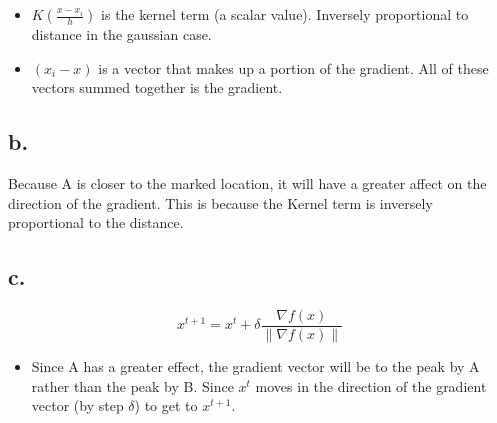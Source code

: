 \documentclass[11pt]{article}
\begin{document}
\begin{itemize}
\item \(K(\frac{x-x_i}{h})\) is the kernel term (a scalar value). Inversely
proportional to distance in the gaussian case.
\item \((x_i-x)\) is a vector that makes up a portion of the gradient. All of these
vectors summed together is the gradient.
\end{itemize}
\subsection*{b.}
\label{sec:org101d391}
Because A is closer to the marked location, it will have a greater affect on the
direction of the gradient. This is because the Kernel term is inversely
proportional to the distance.

\subsection*{c.}
\label{sec:orgd53055f}
\begin{equation}
x^{t+1} = x^t + \delta \frac{\nabla f(x)}{\|\nabla f(x) \|}
\end{equation}

\begin{itemize}
\item Since A has a greater effect, the gradient vector will be to the peak by A
rather than the peak by B. Since \(x^t\) moves in the direction of the
gradient vector (by step \(\delta\)) to get to \(x^{t+1}\).
\end{itemize}
\end{document}
